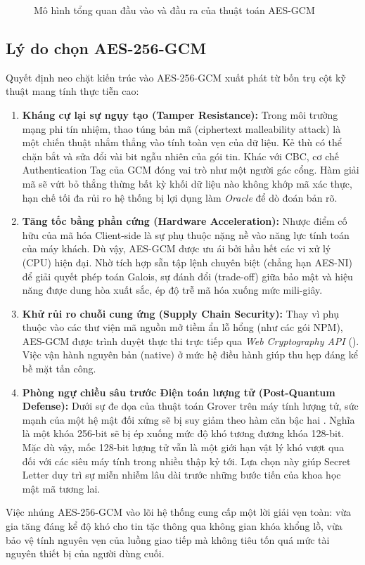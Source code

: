 \begin{figure}[H]
\caption{Mô hình tổng quan đầu vào và đầu ra của thuật toán AES-GCM}
\label{fig:aes_gcm}
\end{figure}

\subsection{Lý do chọn AES-256-GCM}
Quyết định neo chặt kiến trúc vào AES-256-GCM xuất phát từ bốn trụ cột kỹ thuật mang tính thực tiễn cao:
\begin{enumerate}
    \item \textbf{Kháng cự lại sự ngụy tạo (Tamper Resistance):} Trong môi trường mạng phi tín nhiệm, thao túng bản mã (ciphertext malleability attack) là một chiến thuật nhắm thẳng vào tính toàn vẹn của dữ liệu. Kẻ thù có thể chặn bắt và sửa đổi vài bit ngẫu nhiên của gói tin. Khác với CBC, cơ chế Authentication Tag của GCM đóng vai trò như một người gác cổng. Hàm giải mã sẽ vứt bỏ thẳng thừng bất kỳ khối dữ liệu nào không khớp mã xác thực, hạn chế tối đa rủi ro hệ thống bị lợi dụng làm \textit{Oracle} để dò đoán bản rõ.
    \item \textbf{Tăng tốc bằng phần cứng (Hardware Acceleration):} Nhược điểm cố hữu của mã hóa Client-side là sự phụ thuộc nặng nề vào năng lực tính toán của máy khách. Dù vậy, AES-GCM được ưu ái bởi hầu hết các vi xử lý (CPU) hiện đại. Nhờ tích hợp sẵn tập lệnh chuyên biệt (chẳng hạn AES-NI) để giải quyết phép toán Galois, sự đánh đổi (trade-off) giữa bảo mật và hiệu năng được dung hòa xuất sắc, ép độ trễ mã hóa xuống mức mili-giây.
    \item \textbf{Khử rủi ro chuỗi cung ứng (Supply Chain Security):} Thay vì phụ thuộc vào các thư viện mã nguồn mở tiềm ẩn lỗ hổng (như các gói NPM), AES-GCM được trình duyệt thực thi trực tiếp qua \textit{Web Cryptography API} (\textcite{w3c-webcrypto}). Việc vận hành nguyên bản (native) ở mức hệ điều hành giúp thu hẹp đáng kể bề mặt tấn công. 
    \item \textbf{Phòng ngự chiều sâu trước Điện toán lượng tử (Post-Quantum Defense):} Dưới sự đe dọa của thuật toán Grover trên máy tính lượng tử, sức mạnh của một hệ mật đối xứng sẽ bị suy giảm theo hàm căn bậc hai \parencite{nist-ir8105-pqc}. Nghĩa là một khóa 256-bit sẽ bị ép xuống mức độ khó tương đương khóa 128-bit. Mặc dù vậy, mốc 128-bit lượng tử vẫn là một giới hạn vật lý khó vượt qua đối với các siêu máy tính trong nhiều thập kỷ tới. Lựa chọn này giúp Secret Letter duy trì sự miễn nhiễm lâu dài trước những bước tiến của khoa học mật mã tương lai.
\end{enumerate}

Việc nhúng AES-256-GCM vào lõi hệ thống cung cấp một lời giải vẹn toàn: vừa gia tăng đáng kể độ khó cho tin tặc thông qua không gian khóa khổng lồ, vừa bảo vệ tính nguyên vẹn của luồng giao tiếp mà không tiêu tốn quá mức tài nguyên thiết bị của người dùng cuối.